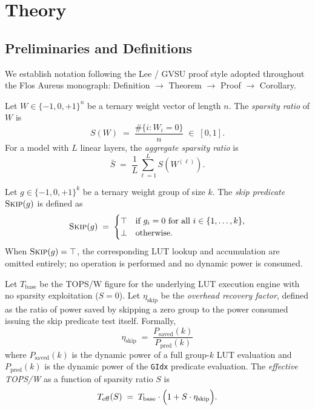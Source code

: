 \section{Theory}
\label{sec:ch79-theory}

\subsection{Preliminaries and Definitions}
\label{subsec:ch79-definitions}

We establish notation following the Lee / GVSU proof style adopted
throughout the Flos Aureus monograph: Definition $\to$ Theorem $\to$
Proof $\to$ Corollary.

\begin{definition}
\label{def:sparsity-ratio}
Let $W \in \{-1, 0, +1\}^n$ be a ternary weight vector of length $n$.
The \emph{sparsity ratio} of $W$ is
\[
  S(W) \;=\; \frac{\#\{i : W_i = 0\}}{n} \;\in\; [0,1].
\]
For a model with $L$ linear layers, the \emph{aggregate sparsity ratio} is
\[
  \bar{S} \;=\; \frac{1}{L} \sum_{\ell=1}^{L} S(W^{(\ell)}).
\]
\end{definition}

\begin{definition}
\label{def:skip-predicate}
Let $g \in \{-1, 0, +1\}^k$ be a ternary weight group of size $k$.
The \emph{skip predicate} $\textsc{Skip}(g)$ is defined as
\[
  \textsc{Skip}(g) \;=\; \begin{cases}
    \top & \text{if } g_i = 0 \text{ for all } i \in \{1,\ldots,k\}, \\
    \bot & \text{otherwise.}
  \end{cases}
\]
When $\textsc{Skip}(g) = \top$, the corresponding LUT lookup and
accumulation are omitted entirely; no operation is performed and no
dynamic power is consumed.
\end{definition}

\begin{definition}
\label{def:effective-tops-w}
Let $T_{\mathrm{base}}$ be the TOPS/W figure for the underlying LUT
execution engine with no sparsity exploitation ($S = 0$).
Let $\eta_{\mathrm{skip}}$ be the \emph{overhead recovery factor},
defined as the ratio of power saved by skipping a zero group to the
power consumed issuing the skip predicate test itself.
Formally,
\[
  \eta_{\mathrm{skip}} \;=\; \frac{P_{\mathrm{saved}}(k)}{P_{\mathrm{pred}}(k)}
\]
where $P_{\mathrm{saved}}(k)$ is the dynamic power of a full group-$k$
LUT evaluation and $P_{\mathrm{pred}}(k)$ is the dynamic power of the
\texttt{GIdx} predicate evaluation.
The \emph{effective TOPS/W} as a function of sparsity ratio $S$ is
\[
  T_{\mathrm{eff}}(S) \;=\; T_{\mathrm{base}} \cdot
    \Bigl(1 + S \cdot \eta_{\mathrm{skip}}\Bigr).
\]
\end{definition}

